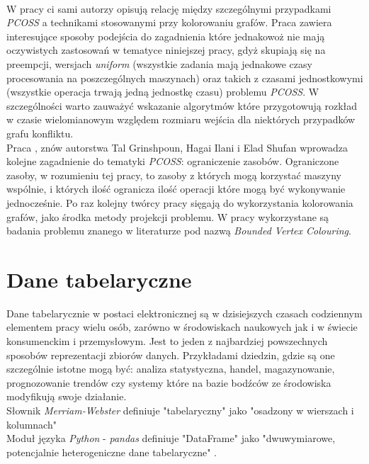 \documentclass[brudnopis]{xmgr}
\begin{document}
\medskip\\
W pracy \cite{GRACOL:2016:X} ci sami autorzy opisują relację między szczególnymi przypadkami \emph{PCOSS} a technikami stosowanymi przy kolorowaniu grafów. Praca zawiera interesujące sposoby podejścia do zagadnienia które jednakowoż nie mają oczywistych zastosowań w tematyce niniejszej pracy, gdyż skupiają się na preempcji, wersjach \emph{uniform} (wszystkie zadania mają jednakowe czasy procesowania na poszczególnych maszynach) oraz takich z czasami jednostkowymi (wszystkie operacja trwają jedną jednostkę czasu) problemu \emph{PCOSS}. W szczególności warto zauważyć wskazanie algorytmów które przygotowują rozkład w czasie wielomianowym względem rozmiaru wejścia dla niektórych przypadków grafu konfliktu.
\medskip\\
Praca \cite{RESRES:2018:X}, znów autorstwa Tal Grinshpoun, Hagai Ilani i Elad Shufan wprowadza kolejne zagadnienie do tematyki \emph{PCOSS}: ograniczenie zasobów. Ograniczone zasoby, w rozumieniu tej pracy, to zasoby z których mogą korzystać maszyny wspólnie, i których ilość ogranicza ilość operacji które mogą być wykonywanie jednocześnie. Po raz kolejny twórcy pracy sięgają do wykorzystania kolorowania grafów, jako środka metody projekcji problemu. W pracy wykorzystane są badania problemu znanego w literaturze pod nazwą \emph{Bounded Vertex Colouring}.

\chapter{Dane tabelaryczne}

Dane tabelarycznie w postaci elektronicznej są w dzisiejszych czasach codziennym elementem pracy wielu osób, zarówno w środowiskach naukowych jak i w świecie konsumenckim i przemysłowym. Jest to jeden z najbardziej powszechnych sposobów reprezentacji zbiorów danych. Przykładami dziedzin, gdzie są one szczególnie istotne mogą być: analiza statystyczna, handel, magazynowanie, prognozowanie trendów czy systemy które na bazie bodźców ze środowiska modyfikują swoje działanie.
\medskip\\

Słownik \emph{Merriam-Webster} definiuje "tabelaryczny" jako "osadzony w wierszach i kolumnach" \cite{MW:TAB}
\medskip\\

Moduł języka \emph{Python} - \emph{pandas} definiuje "DataFrame" jako "dwuwymiarowe, potencjalnie heterogeniczne dane tabelaryczne" \cite{P:DF}.
\medskip\\
\end{document}
